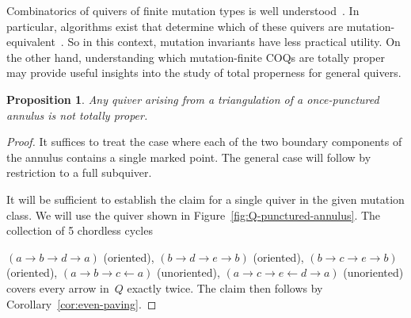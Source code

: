 \documentclass[11pt, letterpaper]{amsart}
\newtheorem{proposition}[theorem]{Proposition}
\theoremstyle{definition}
\numberwithin{equation}{section}
\begin{document}
Combinatorics of quivers of finite mutation types is well understood~\cite{FeShTu, cats1}.   
In particular, algorithms exist that determine which of these quivers are mutation-equivalent~\cite{WeiwenGu}. 
So in this context, mutation invariants have less practical utility.
On the other hand, understanding which mutation-finite COQs are totally proper 
may provide useful insights into the study of total properness for general quivers.

\begin{proposition}
\label{pr:punctured-annulus}
Any quiver arising from a triangulation of a once-punctured annulus is not totally proper. 
\end{proposition}

\begin{proof}
It suffices to treat the case where each of the two boundary components
of the annulus contains a single marked point. The general case will follow by restriction to a full subquiver. 

It will be sufficient to establish the claim for a single quiver
in the given mutation class. We will use the quiver shown in 
Figure~\ref{fig:Q-punctured-annulus}. 
%
The collection of 5 chordless cycles 

$(a \rightarrow b \rightarrow d\rightarrow a)$ (oriented),
$(b \rightarrow d \rightarrow e\rightarrow b)$ (oriented),
$(b \rightarrow c \rightarrow e\rightarrow b)$ (oriented),
$(a \rightarrow b \rightarrow c \leftarrow a)$ (unoriented), 
$(a \rightarrow c \rightarrow e \leftarrow d \rightarrow a)$ (unoriented)
covers every arrow in~$Q$ exactly twice. 
The claim then follows by Corollary~\ref{cor:even-paving}. 
\end{proof}
\end{document}
